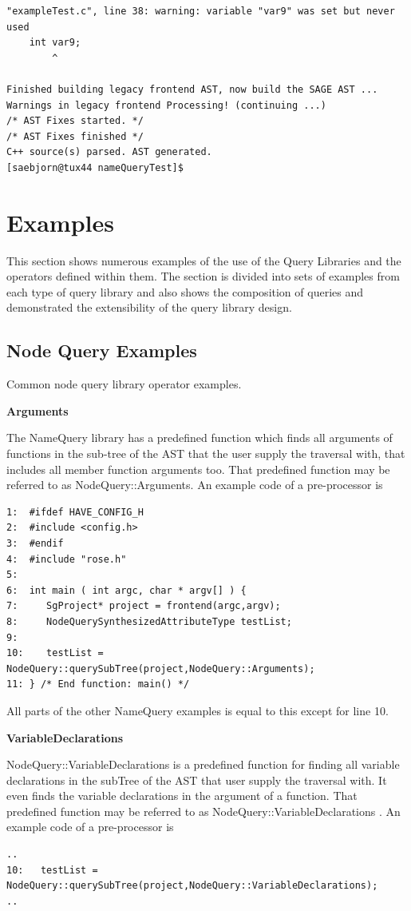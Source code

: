 {\begin{verbatim}
"exampleTest.c", line 38: warning: variable "var9" was set but never used
    int var9;
        ^

Finished building legacy frontend AST, now build the SAGE AST ...
Warnings in legacy frontend Processing! (continuing ...)
/* AST Fixes started. */
/* AST Fixes finished */
C++ source(s) parsed. AST generated.
[saebjorn@tux44 nameQueryTest]$
\end{verbatim}

\section{Examples}
   This section shows numerous examples of the use of the Query Libraries and
the operators defined within them.  The section is divided into sets of 
examples from each type of query library and also shows the composition
of queries and demonstrated the extensibility of the query library design.

\subsection{Node Query Examples}
   Common node query library operator examples.

\textbf{Arguments}

The NameQuery library has a predefined function which finds all 
arguments of functions in the sub-tree of the AST that the user supply the
traversal with, that includes all member function arguments too. That
predefined function may be referred to as
NodeQuery::Arguments. An example code of a
pre-processor is
\begin{verbatim}
1:  #ifdef HAVE_CONFIG_H
2:  #include <config.h>
3:  #endif
4:  #include "rose.h"
5:
6:  int main ( int argc, char * argv[] ) {
7:     SgProject* project = frontend(argc,argv);
8:     NodeQuerySynthesizedAttributeType testList;
9:	
10:    testList = NodeQuery::querySubTree(project,NodeQuery::Arguments);
11: } /* End function: main() */
\end{verbatim}
All parts of the other NameQuery examples is equal to this except for line 10.

\textbf{VariableDeclarations}

NodeQuery::VariableDeclarations is a predefined function for finding
all variable declarations in the subTree of the AST that user supply
the traversal with. It even finds the variable declarations in the
argument of a function. That predefined function may be referred to as 
NodeQuery::VariableDeclarations  . An example code of a pre-processor
is
\begin{verbatim}
..
10:   testList = NodeQuery::querySubTree(project,NodeQuery::VariableDeclarations);
..
\end{verbatim}

}
